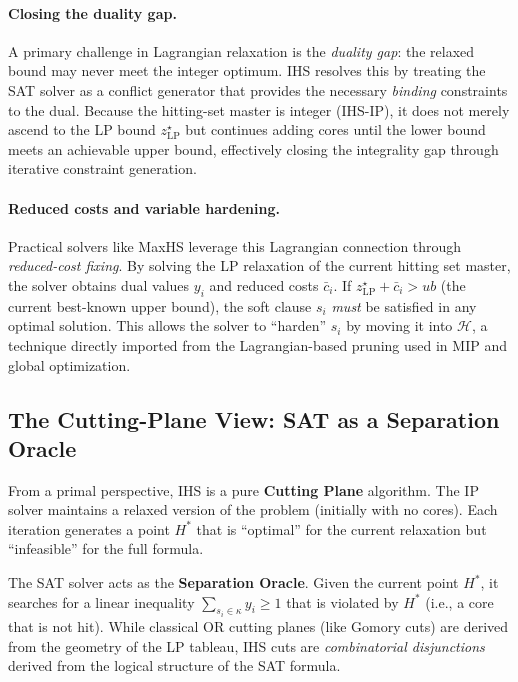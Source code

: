 \paragraph{Closing the duality gap.}
A primary challenge in Lagrangian relaxation is the \emph{duality gap}: the
relaxed bound may never meet the integer optimum. IHS resolves this by
treating the SAT solver as a conflict generator that provides the necessary
\emph{binding} constraints to the dual. Because the hitting-set master is integer
(\textsc{IHS-IP}), it does not merely ascend to the LP bound $z^\star_{\mathrm{LP}}$
but continues adding cores until the lower bound meets an achievable upper bound,
effectively closing the integrality gap through iterative constraint generation.

\paragraph{Reduced costs and variable hardening.}
Practical solvers like MaxHS leverage this Lagrangian connection through
\emph{reduced-cost fixing}. By solving the LP relaxation of the current hitting
set master, the solver obtains dual values $y_i$ and reduced costs $\bar{c}_i$.
If $z^\star_{\mathrm{LP}} + \bar{c}_i > \mathit{ub}$ (the current best-known upper
bound), the soft clause $s_i$ \emph{must} be satisfied in any optimal solution.
This allows the solver to ``harden'' $s_i$ by moving it into $\mathcal{H}$, a
technique directly imported from the Lagrangian-based pruning used in MIP and
global optimization.

\subsection{The Cutting-Plane View: SAT as a Separation Oracle}
\label{sec:cutting}

From a primal perspective, IHS is a pure \textbf{Cutting Plane} algorithm. The
IP solver maintains a relaxed version of the problem (initially with no cores).
Each iteration generates a point $H^*$ that is ``optimal'' for the current
relaxation but ``infeasible'' for the full formula.

The SAT solver acts as the \textbf{Separation Oracle}. Given the current point
$H^*$, it searches for a linear inequality $\sum_{s_i \in \kappa} y_i \ge 1$
that is violated by $H^*$ (i.e., a core that is not hit). While classical OR
cutting planes (like Gomory cuts) are derived from the geometry of the LP
tableau, IHS cuts are \emph{combinatorial disjunctions} derived from the logical
structure of the SAT formula.

